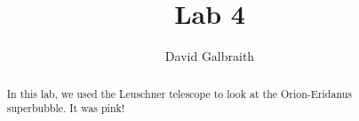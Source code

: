 \documentclass[11pt]{article}
\begin{document}
\title{Lab 4}
\author{David Galbraith}
\maketitle

\normalsize
\begin{abstract} 
In this lab, we used the Leuschner telescope to look at the Orion-Eridanus superbubble. It was pink! %

\end{abstract}


\medskip                        %

\thispagestyle{plain}
\end{document}
